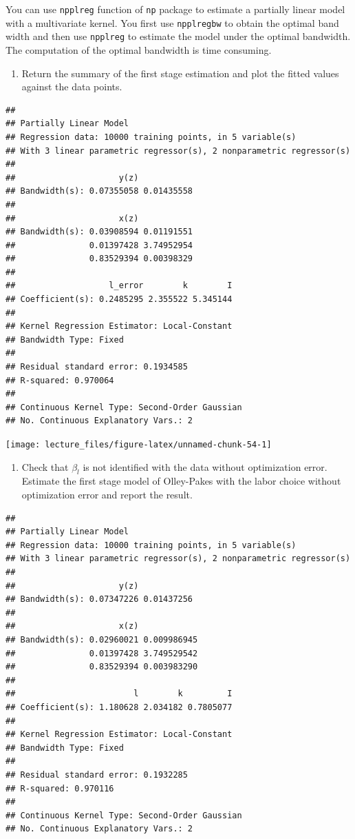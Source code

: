 \documentclass[]{book}
\providecommand{\tightlist}{%
  \setlength{\itemsep}{0pt}\setlength{\parskip}{0pt}}
\begin{document}
You can use \texttt{npplreg} function of \texttt{np} package to estimate
a partially linear model with a multivariate kernel. You first use
\texttt{npplregbw} to obtain the optimal band width and then use
\texttt{npplreg} to estimate the model under the optimal bandwidth. The
computation of the optimal bandwidth is time consuming.

\begin{enumerate}
\def\labelenumi{\arabic{enumi}.}
\setcounter{enumi}{2}
\tightlist
\item
  Return the summary of the first stage estimation and plot the fitted
  values against the data points.
\end{enumerate}

\begin{verbatim}
## 
## Partially Linear Model
## Regression data: 10000 training points, in 5 variable(s)
## With 3 linear parametric regressor(s), 2 nonparametric regressor(s)
## 
##                     y(z)           
## Bandwidth(s): 0.07355058 0.01435558
## 
##                     x(z)           
## Bandwidth(s): 0.03908594 0.01191551
##               0.01397428 3.74952954
##               0.83529394 0.00398329
## 
##                   l_error        k        I
## Coefficient(s): 0.2485295 2.355522 5.345144
## 
## Kernel Regression Estimator: Local-Constant
## Bandwidth Type: Fixed
## 
## Residual standard error: 0.1934585
## R-squared: 0.970064
## 
## Continuous Kernel Type: Second-Order Gaussian
## No. Continuous Explanatory Vars.: 2
\end{verbatim}

\begin{center}\texttt{[image: lecture\_files/figure-latex/unnamed-chunk-54-1]} \end{center}

\begin{enumerate}
\def\labelenumi{\arabic{enumi}.}
\setcounter{enumi}{3}
\tightlist
\item
  Check that \(\beta_l\) is not identified with the data without
  optimization error. Estimate the first stage model of Olley-Pakes with
  the labor choice without optimization error and report the result.
\end{enumerate}

\begin{verbatim}
## 
## Partially Linear Model
## Regression data: 10000 training points, in 5 variable(s)
## With 3 linear parametric regressor(s), 2 nonparametric regressor(s)
## 
##                     y(z)           
## Bandwidth(s): 0.07347226 0.01437256
## 
##                     x(z)            
## Bandwidth(s): 0.02960021 0.009986945
##               0.01397428 3.749529542
##               0.83529394 0.003983290
## 
##                        l        k         I
## Coefficient(s): 1.180628 2.034182 0.7805077
## 
## Kernel Regression Estimator: Local-Constant
## Bandwidth Type: Fixed
## 
## Residual standard error: 0.1932285
## R-squared: 0.970116
## 
## Continuous Kernel Type: Second-Order Gaussian
## No. Continuous Explanatory Vars.: 2
\end{verbatim}
\end{document}
